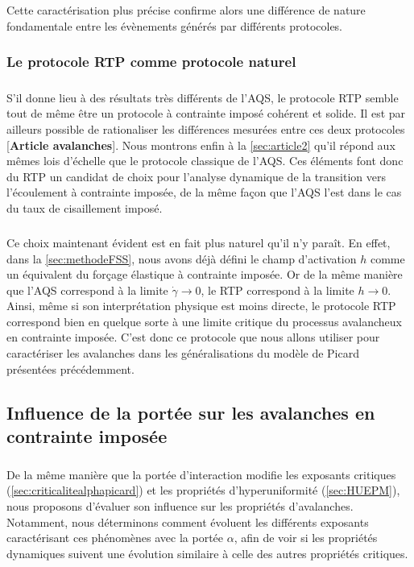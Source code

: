 \subparagraph{}Cette caractérisation plus précise confirme alors une différence de nature fondamentale entre les évènements générés par différents protocoles.

\subsubsection{Le protocole RTP comme protocole naturel}

\subparagraph{}S'il donne lieu à des résultats très différents de l'AQS, le protocole RTP semble tout de même être un protocole à contrainte imposé cohérent et solide. Il est par ailleurs possible de rationaliser les différences mesurées entre ces deux protocoles [\textbf{Article avalanches}]. Nous montrons enfin à la \autoref{sec:article2} qu'il répond aux mêmes lois d'échelle que le protocole classique de l'AQS. Ces éléments font donc du RTP un candidat de choix pour l'analyse dynamique de la transition vers l'écoulement à contrainte imposée, de la même façon que l'AQS l'est dans le cas du taux de cisaillement imposé. 

\subparagraph{}Ce choix maintenant évident est en fait plus naturel qu'il n'y paraît. En effet, dans la \autoref{sec:methodeFSS}, nous avons déjà défini le champ d'activation $h$ comme un équivalent du forçage élastique à contrainte imposée. Or de la même manière que l'AQS correspond à la limite $\dot{\gamma} \rightarrow 0$, le RTP correspond à la limite $h\rightarrow 0$. Ainsi, même si son interprétation physique est moins directe, le protocole RTP correspond bien en quelque sorte à une limite critique du processus avalancheux en contrainte imposée. C'est donc ce protocole que nous allons utiliser pour caractériser les avalanches dans les généralisations du modèle de Picard présentées précédemment.

\subsection{Influence de la portée sur les avalanches en contrainte imposée}

\subparagraph{}De la même manière que la portée d'interaction modifie les exposants critiques (\autoref{sec:criticalitealphapicard}) et les propriétés d'hyperuniformité (\autoref{sec:HUEPM}), nous proposons d'évaluer son influence sur les propriétés d'avalanches. Notamment, nous déterminons comment évoluent les différents exposants caractérisant ces phénomènes avec la portée $\alpha$, afin de voir si les propriétés dynamiques suivent une évolution similaire à celle des autres propriétés critiques.

